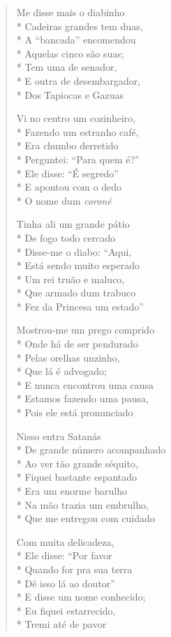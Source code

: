 \begin{verse}
Me disse mais o diabinho\\*
Cadeiras grandes tem duas,\\*
A ``bancada'' encomendou\\*
Aquelas cinco são suas;\\*
Tem uma de senador,\\*
E outra de desembargador,\\*
Dos Tapiocas e Gazuas

Vi no centro um cozinheiro,\\*
Fazendo um estranho café,\\*
Era chumbo derretido\\*
Perguntei: ``Para quem é?''\\*
Ele disse: ``É segredo''\\*
E apontou com o dedo\\*
O nome dum \textit{coroné}

Tinha ali um grande pátio\\*
De fogo todo cercado\\*
Disse-me o diabo: ``Aqui,\\*
Está sendo muito esperado\\*
Um rei truão e maluco,\\*
Que armado dum trabuco\\*
Fez da Princesa um estado''

Mostrou-me um prego comprido\\*
Onde há de ser pendurado\\*
Pelas orelhas unzinho,\\*
Que lá é advogado;\\*
E nunca encontrou uma causa\\*
Estamos fazendo uma pausa,\\*
Pois ele está pronunciado

Nisso entra Satanás\\*
De grande número acompanhado\\*
Ao ver tão grande séquito,\\*
Fiquei bastante espantado\\*
Era um enorme barulho\\*
Na mão trazia um embrulho,\\*
Que me entregou com cuidado

Com muita delicadeza,\\*
Ele disse: ``Por favor\\*
Quando for pra sua terra\\*
Dê isso lá ao doutor''\\*
E disse um nome conhecido;\\*
Eu fiquei estarrecido,\\*
Tremi até de pavor


\end{verse}
